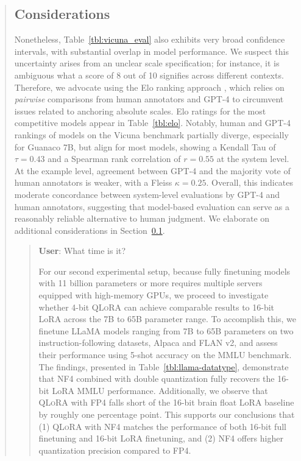 \begin{quote}
\subsection{Considerations}
\label{ssec:considerations}

Nonetheless, Table~\ref{tbl:vicuna_eval} also exhibits very broad confidence intervals, with substantial overlap in model performance. We suspect this uncertainty arises from an unclear scale specification; for instance, it is ambiguous what a score of 8 out of 10 signifies across different contexts. Therefore, we advocate using the Elo ranking approach \citep{elo1967proposed}, which relies on \textit{pairwise} comparisons from human annotators and GPT-4 to circumvent issues related to anchoring absolute scales. Elo ratings for the most competitive models appear in Table~\ref{tbl:elo}. Notably, human and GPT-4 rankings of models on the Vicuna benchmark partially diverge, especially for Guanaco 7B, but align for most models, showing a Kendall Tau of $\tau=0.43$ and a Spearman rank correlation of $r=0.55$ at the system level. At the example level, agreement between GPT-4 and the majority vote of human annotators is weaker, with a Fleiss $\kappa=0.25$. Overall, this indicates moderate concordance between system-level evaluations by GPT-4 and human annotators, suggesting that model-based evaluation can serve as a reasonably reliable alternative to human judgment. We elaborate on additional considerations in Section~\ref{ssec:considerations}.

\begin{quote}
    \textbf{User}: What time is it?

For our second experimental setup, because fully finetuning models with 11 billion parameters or more requires multiple servers equipped with high-memory GPUs, we proceed to investigate whether 4-bit \textsc{QLoRA} can achieve comparable results to 16-bit LoRA across the 7B to 65B parameter range. To accomplish this, we finetune LLaMA models ranging from 7B to 65B parameters on two instruction-following datasets, Alpaca and FLAN v2, and assess their performance using 5-shot accuracy on the MMLU benchmark. The findings, presented in Table~\ref{tbl:llama-datatype}, demonstrate that NF4 combined with double quantization fully recovers the 16-bit LoRA MMLU performance. Additionally, we observe that \textsc{QLoRA} with FP4 falls short of the 16-bit brain float LoRA baseline by roughly one percentage point. This supports our conclusions that (1) \textsc{QLoRA} with NF4 matches the performance of both 16-bit full finetuning and 16-bit LoRA finetuning, and (2) NF4 offers higher quantization precision compared to FP4.


\end{quote}
\end{quote}
